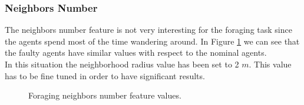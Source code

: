 \documentclass[../../Thesis.tex]{subfiles}
\begin{document}
			\subsubsection{Neighbors Number}
				The neighbors number feature is not very interesting for the foraging task since the agents spend most of the time wandering around. In Figure \ref{fig:Foraging_neighbors_number} we can see that the faulty agents have similar values with respect to the nominal agents. \\
				In this situation the neighborhood radius value has been set to 2 $m$. This value has to be fine tuned in order to have significant results.
				\begin{figure}
					\centering
					\quad
					\caption{Foraging neighbors number feature values.}
					\label{fig:Foraging_neighbors_number}
				\end{figure}
			
\end{document}
